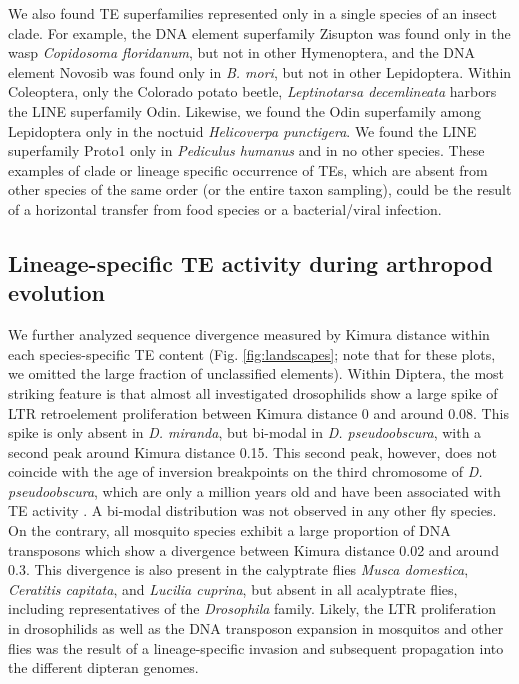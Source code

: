 We also found TE superfamilies represented only in a single species of
an insect clade. For example, the DNA element superfamily Zisupton was
found only in the wasp \emph{Copidosoma floridanum}, but not in other
Hymenoptera, and the DNA element Novosib was found only in \emph{B.
mori}, but not in other Lepidoptera. Within Coleoptera, only the
Colorado potato beetle, \emph{Leptinotarsa decemlineata} harbors the
LINE superfamily Odin. Likewise, we found the Odin superfamily among
Lepidoptera only in the noctuid \emph{Helicoverpa punctigera}. We found
the LINE superfamily Proto1 only in \emph{Pediculus humanus} and in no
other species. These examples of clade or lineage specific occurrence of
TEs, which are absent from other species of the same order (or the
entire taxon sampling), could be the result of a horizontal transfer
from food species or a bacterial/viral infection.



\subsection{Lineage-specific TE activity during arthropod
evolution}

We further analyzed sequence divergence measured by Kimura distance
within each species-specific TE content (Fig. \ref{fig:landscapes}; note that for these
plots, we omitted the large fraction of unclassified elements). Within
Diptera, the most striking feature is that almost all investigated
drosophilids show a large spike of LTR retroelement proliferation
between Kimura distance 0 and around 0.08. This spike is only absent in
\emph{D. miranda}, but bi-modal in \emph{D. pseudoobscura}, with a
second peak around Kimura distance 0.15. This second peak, however, does
not coincide with the age of inversion breakpoints on the third
chromosome of \emph{D. pseudoobscura}, which are only a million years
old and have been associated with TE activity \citep{Wallace2011}. A
bi-modal distribution was not observed in any other fly species. On the
contrary, all mosquito species exhibit a large proportion of DNA
transposons which show a divergence between Kimura distance 0.02 and
around 0.3. This divergence is also present in the calyptrate flies
\emph{Musca domestica}, \emph{Ceratitis capitata}, and \emph{Lucilia
cuprina}, but absent in all acalyptrate flies, including representatives
of the \emph{Drosophila} family. Likely, the LTR proliferation in
drosophilids as well as the DNA transposon expansion in mosquitos and
other flies was the result of a lineage-specific invasion and subsequent
propagation into the different dipteran genomes.


